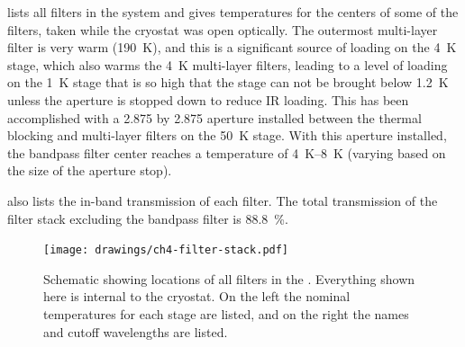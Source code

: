  lists all filters in the system and gives temperatures for the centers of some of the filters, taken while the cryostat was open optically.
The outermost multi-layer filter is very warm (\SI{190}{\K}), and this is a significant source of loading on the \SI{4}{\K} stage, which also warms the \SI{4}{\K} multi-layer filters, leading to a level of loading on the \SI{1}{\K} stage that is so high that the stage can not be brought below \SI{1.2}{\K} unless the aperture is stopped down to reduce IR loading.
This has been accomplished with a \SI{2.875}{\in} by \SI{2.875}{\in} aperture installed between the thermal blocking and multi-layer filters on the \SI{50}{\K} stage.
With this aperture installed, the bandpass filter center reaches a temperature of \SIrange{4}{8}{\K} (varying based on the size of the aperture stop).

 also lists the in-band transmission of each filter.
The total transmission of the filter stack excluding the bandpass filter is \SI{88.8}{\percent}.

\begin{figure}
\centering
\texttt{[image: drawings/ch4-filter-stack.pdf]}
\caption{
  Schematic showing locations of all filters in the \Imager.
  Everything shown here is internal to the cryostat.
  On the left the nominal temperatures for each stage are listed, and on the right the names and cutoff wavelengths are listed.
}
\label{fig:ch4-filter-stack}
\end{figure}

